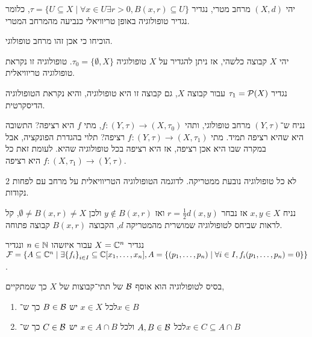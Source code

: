 \begin{example}
	יהי $(X, d)$ מרחב מטרי, נגדיר $\tau = \{ U \subseteq X \mid \forall x \in U \exists r > 0, B(x, r) \subseteq U \}$, כלומר נגדיר טופולוגיה באופן טריוויאלי כנביעה מהמרחב המטרי.
\end{example}
\begin{exercise}
	הוכיחו כי אכן זהו מרחב טופולוגי.
\end{exercise}
\begin{example}
	יהי $X$ קבוצה כלשהי, אז ניתן להגדיר על $X$ טופולוגיה $\tau_0 = \{ \emptyset, X \}$.
	טופולוגיה זו נקראת טופולוגיה טריוויאלית.
\end{example}
\begin{example}
	נגדיר $\tau_1 = \mathcal{P}(X)$ עבור קבוצה $X$, גם קבוצה זו היא טופולוגיה, והיא נקראת הטופולוגיה הדיסקרטית.
\end{example}
\begin{example}
	נניח ש־$(Y, \tau)$ מרחב טופולוגי, ותהי $f : (Y, \tau) \to (X, \tau_0)$, מתי $f$ היא רציפה? התשובה היא שהיא רציפה תמיד.
	מתי $f : (Y, \tau) \to (X, \tau_1)$ רציפה? תלוי בהגדרת הפונקציה, אבל במקרה שבו היא אכן רציפה, אז היא רציפה בכל טופולוגיה שהיא.
	לעומת זאת כל $f : (X, \tau_1) \to (Y, \tau)$ היא רציפה.
\end{example}
\begin{remark}
	לא כל טופולוגיה נובעת ממטריקה.
	לדוגמה הטופולוגיה הטריוויאלית על מרחב עם לפחות 2 נקודות.
\end{remark}
\begin{remark}
	נניח $x, y \in X$ אז נבחר $r = \frac{1}{2} d(x, y)$ ואז $y \notin B(x, r)$ ולכן $\emptyset \ne B(x, r) \ne X$, קל לראות שביחס לטופולוגיה שמושרית מהמטריקה $d$, הקבוצה $B(x, r)$ קבוצה פתוחה.
\end{remark}
\begin{example}
	נגדיר $X = \mathbb{C}^n$ עבור איזשהו $n \in \mathbb{N}$ ונגדיר $\mathcal{F} = \{ A \subseteq \mathbb{C}^n \mid \exists {\{f_i\}}_{i \in I} \subseteq \mathbb{C}[x_1, \dots, x_n], A = \{(p_1, \dots, p_n) \mid \forall i \in I, f_i(p_1, \dots, p_n) = 0 \}\}$.
\end{example}
\begin{definition}
	בסיס לטופולוגיה הוא אוסף $\mathcal{B}$ של תתי־קבוצות של $X$ כך שמתקיים,
	\begin{enumerate}
		\item לכל $x \in X$ יש $B \in \mathcal{B}$ כך ש־$x \in B$
		\item לכל $A, B \in \mathcal{B}$ ולכל $x \in A \cap B$ יש $C \in \mathcal{B}$ כך ש־$x \in C \subseteq A \cap B$
	\end{enumerate}
\end{definition}

